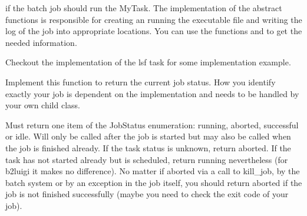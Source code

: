 \documentclass[letterpaper,10pt,english]{sphinxmanual}
\begin{document}
\begin{fulllineitems}
\begin{description}
\begin{sphinxVerbatim}[commandchars=\\\{\}]
    
\end{sphinxVerbatim}

if the batch job should run the MyTask. The implementation of the
abstract functions is responsible for creating an running the executable file and writing the log of
the job into appropriate locations. You can use the functions 
and  to get the needed information.

Checkout the implementation of the lsf task for some implementation example.

\end{description}

\begin{fulllineitems}
\label{\detokenize{usage/batch:b2luigi.batch.processes.BatchProcess.get_job_status}}
Implement this function to return the current job status.
How you identify exactly your job is dependent on the implementation and needs to
be handled by your own child class.

Must return one item of the JobStatus enumeration: running, aborted, successful or idle.
Will only be called after the job is started but may also be called when
the job is finished already.
If the task status is unknown, return aborted. If the task has not started already but
is scheduled, return running nevertheless (for b2luigi it makes no difference).
No matter if aborted via a call to kill\_job, by the batch system or by an exception in the
job itself, you should return aborted if the job is not finished successfully
(maybe you need to check the exit code of your job).

\end{fulllineitems}


\end{fulllineitems}
\end{document}
